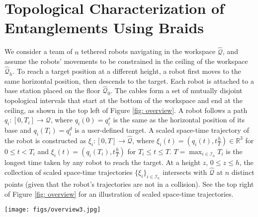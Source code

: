 \documentclass[conference]{IEEEtran}
\newtheorem{ass}[thm]{Assumption}
\newcommand*{\myset}[1]{\mathcal{#1}} %
\newcommand*{\workspace}{\myset{Q}} %
\newcommand*{\config}{q} %
\newcommand*{\rthree}{\mathbb{R}^3}
\newcommand*{\rtwo}{\mathbb{R}^2}
\newcommand*{\height}{h}
\newcommand*{\aug}[1]{\hat{#1}} %
\newcommand*{\robpath}{q} %
\newcommand*{\ra}{\rightarrow} %
\newcommand*{\timet}{T} %
\newcommand*{\sptime}{\xi} %
\begin{document}
\section{Topological Characterization of Entanglements Using Braids}\label{sec:braids}
We consider a team of $n$ tethered robots navigating in the workspace $\aug{\workspace}$, 
and assume the robots' movements to be constrained in the ceiling of the workspace $\aug{\workspace}_\height$.
To reach a target position at a different height, a robot first moves to the same horizontal position, then descends to the target.
Each robot is attached to a base station placed on the floor $\aug{\workspace}_0$.
The cables form a set of mutually disjoint topological intervals that start at the bottom of the workspace and end at the ceiling, as shown in the top left of Figure \ref{fig: overview}.
A robot follows a path $\robpath_i:[0,\timet_i]\ra\workspace$, where $\robpath_i(0)=\config_i^s$ is the same as the horizontal position of its base and $\robpath_i(\timet_i)=\config_i^d$ is a user-defined target.
A scaled space-time trajectory of the robot is constructed as $\sptime_i:[0,\timet]\ra\aug{\workspace}$, where $\sptime_i(t)=(\robpath_i(t),t\frac{\height}{\timet})\in\rthree$ for $0\leq t<\timet_i$ and $\sptime_i(t)=(\robpath_i(\timet_i),t\frac{\height}{\timet})$ for $\timet_i\leq t\leq \timet$.
$\timet=\max_{i\in\myset{I}_{n}}\timet_i$ is the longest time taken by any robot to reach the target.
At a height $z$, $0\leq z\leq\height$, the collection of scaled space-time trajectories $\{\sptime_i\}_{i\in\myset{I}_n}$ intersects with $\aug{\workspace}$ at $n$ distinct points (given that the robot's trajectories are not in a collision). See the top right of Figure \ref{fig: overview} for an illustration of scaled space-time trajectories.

\begin{figure*}[!t]
\centering
\texttt{[image: figs/overview3.jpg]}
\caption{\footnotesize Overview of the approach.}
\label{fig: overview}
\end{figure*}
\end{document}
